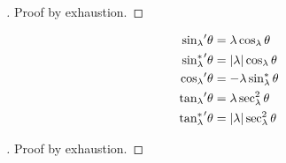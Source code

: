 \documentclass[../main.tex]{subfiles}
\begin{document}
\begin{proof}[]
Proof by exhaustion.
\end{proof}
\begin{proposition}\label{M:Trigonometry:Derivative}
\begin{align*}
{\sin_\lambda}^\prime{\theta}&=\lambda\cos_\lambda{\theta}\\
{\sin_\lambda^\ast}^\prime{\theta}&=\lvert\lambda\rvert\cos_\lambda{\theta}\\
{\cos_\lambda}^\prime{\theta}&=-\lambda\sin_\lambda^\ast{\theta}\\
{\tan_\lambda}^\prime{\theta}&=\lambda\sec_\lambda^2{\theta}\\
{\tan_\lambda^\ast}^\prime{\theta}&=\lvert\lambda\rvert\sec_\lambda^2{\theta}
\end{align*}
\end{proposition}
\begin{proof}[]
Proof by exhaustion.
\end{proof}
\end{document}
